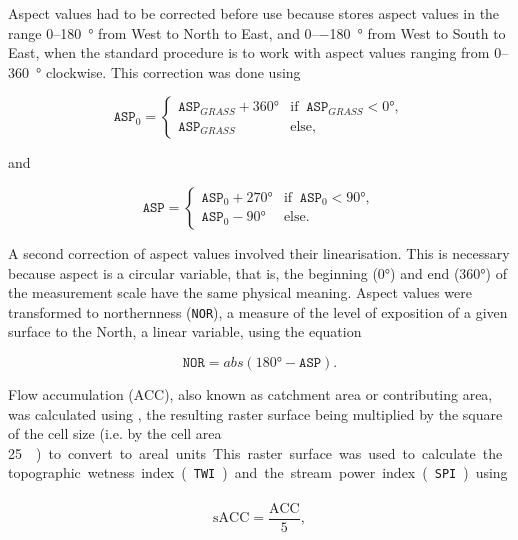 Aspect values had to be corrected before use because  stores aspect values in the range 
0--\SI{+180}{\degree} from West to North to East, and 0--\SI{-180}{\degree} from West to South to East, when 
the standard procedure is to work with aspect values ranging from 0--\SI{360}{\degree} clockwise. This 
correction was done using

\begin{equation}
 \texttt{ASP}_{0} =
 \begin{cases}
  \texttt{ASP}_{GRASS} + \ang{360} & \text{if}\;\; \texttt{ASP}_{GRASS} < \ang{0}, \\
  \texttt{ASP}_{GRASS}             & \text{else},
 \end{cases}
\end{equation}

\noindent and

\begin{equation}
 \texttt{ASP} =
 \begin{cases}
  \texttt{ASP}_{0} + \ang{270} & \text{if}\;\; \texttt{ASP}_{0} < \ang{90}, \\
  \texttt{ASP}_{0} - \ang{90}  & \text{else}.
 \end{cases}
\end{equation}

\noindent A second correction of aspect values involved their linearisation. This is necessary because aspect 
is a circular variable, that is, the beginning (\ang{0}) and end (\ang{360}) of the measurement scale have the 
same physical meaning. Aspect values were transformed to northernness (\texttt{NOR}), a measure of the level 
of exposition of a given surface to the North, a linear variable, using the equation

\begin{equation}\label{eqn:NOR}
 \texttt{NOR} = abs(\ang{180} - \texttt{ASP}).
\end{equation}  

Flow accumulation (ACC), also known as catchment area or contributing area, was calculated using 
, the resulting raster surface being multiplied by the square of the cell size (i.e. by the 
cell area \SI{25}{\metre\square}) to convert to areal units. This raster surface was used to calculate 
the topographic wetness index (\texttt{TWI}) and the stream power index (\texttt{SPI}) using

\begin{equation}\label{eqn:sACC}
 \text{sACC} = \dfrac{\text{ACC}}{5},
\end{equation}

